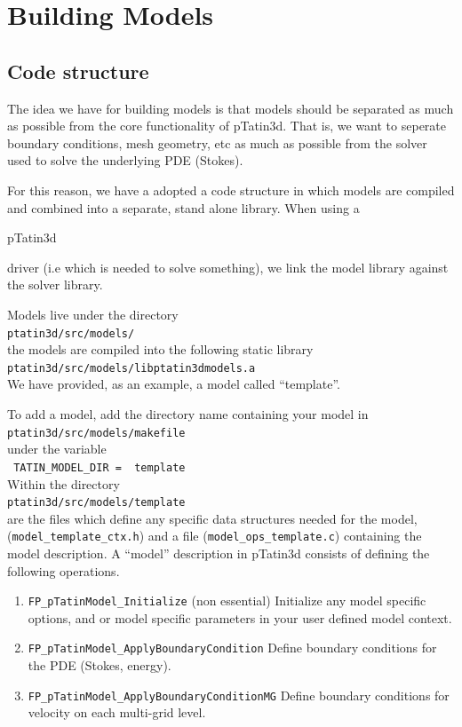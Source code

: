 \documentclass[paper=a4, fontsize=11pt,twoside]{scrartcl}
\newcommand{\ptat}{{pTatin3d}}
\newcommand{\shellcmd}[1]{\\\indent\indent\texttt{\hspace{5mm}\footnotesize #1}\\}
\newcommand{\unix}[1]{\texttt{\footnotesize #1}}
\begin{document}
\newpage
\section{Building Models}

\subsection{Code structure}
The idea we have for building models is that models should be separated as much as possible
from the core functionality of {\ptat}. That is, we want to seperate boundary conditions,
mesh geometry, etc as much as possible from the solver used to solve the underlying PDE (Stokes).

For this reason, we have a adopted a code structure in which models are compiled and combined into
a separate, stand alone library. When using a {\ptat{ driver (i.e which is needed to solve something),
we link the model library against the solver library.

Models live under the directory
	\shellcmd{ptatin3d/src/models/}
the models are compiled into the following static library
	\shellcmd{ptatin3d/src/models/libptatin3dmodels.a}
	
We have provided, as an example, a model called ``template''.
	
To add a model, add the directory name containing your model in
	\shellcmd{ptatin3d/src/models/makefile}
under the variable
	\shellcmd{
	TATIN\_MODEL\_DIR = \
        template
	}
	
Within the directory
	\shellcmd{ptatin3d/src/models/template}
are the files which define any specific data structures needed for the model,
	(\unix{model\_template\_ctx.h})
and a file (\unix{model\_ops\_template.c}) containing the model description.
A ``model'' description in {\ptat} consists of defining the following operations.
\begin{enumerate}
	\item \unix{FP\_pTatinModel\_Initialize} (non essential)
	Initialize any model specific options, and or model specific parameters in your user defined model context.

	\item \unix{FP\_pTatinModel\_ApplyBoundaryCondition}
	Define boundary conditions for the PDE (Stokes, energy).

	\item \unix{FP\_pTatinModel\_ApplyBoundaryConditionMG}
	Define boundary conditions for velocity on each multi-grid level.


\end{enumerate}}}
\end{document}
